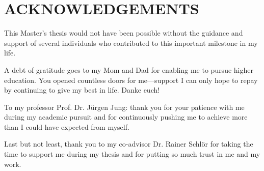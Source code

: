 \chapter*{ACKNOWLEDGEMENTS}
\thispagestyle{empty}

\noindent
This Master’s thesis would not have been possible without the guidance and support of several individuals who contributed to this important milestone in my life.

A debt of gratitude goes to my Mom and Dad for enabling me to pursue higher education. You opened countless doors for me—support I can only hope to repay by continuing to give my best in life. Danke euch!

To my professor Prof. Dr. Jürgen Jung: thank you for your patience with me during my academic pursuit and for continuously pushing me to achieve more than I could have expected from myself.

Last but not least, thank you to my co-advisor Dr. Rainer Schlör for taking the time to support me during my thesis and for putting so much trust in me and my work.